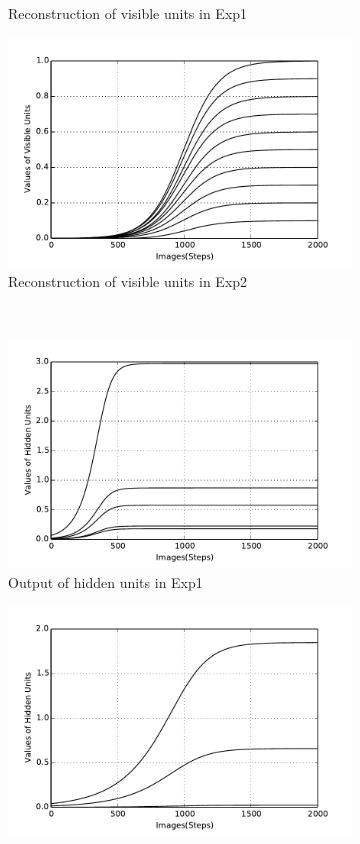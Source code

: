 \begin{figure}
\begin{subfigure}[t]{0.4\textwidth}
			\caption{Reconstruction of visible units in Exp1}
		\end{subfigure}
		\begin{subfigure}[t]{0.4\textwidth}
			\includegraphics[width=\textwidth]{pics_ae/exp2_recon_non.pdf}
			\caption{Reconstruction of visible units in Exp2}
		\end{subfigure}\\
		\begin{subfigure}[t]{0.4\textwidth}
			\includegraphics[width=\textwidth]{pics_ae/exp1_hid_non.pdf}
			\caption{Output of hidden units in Exp1}
		\end{subfigure}
		\begin{subfigure}[t]{0.4\textwidth}
			\includegraphics[width=\textwidth]{pics_ae/exp2_hid_non.pdf}

\end{subfigure}
\end{figure}
